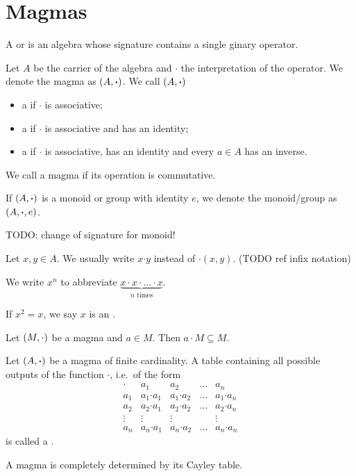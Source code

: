 \chapter{Magmas}
\begin{definition}
A  or  is an algebra whose signature contains a single ginary operator.

Let $A$ be the carrier of the algebra and $\boldsymbol{\cdot}$ the interpretation of the operator. We denote the magma as $\sSet{A,\boldsymbol{\cdot}}$. We call $\sSet{A,\boldsymbol{\cdot}}$
\begin{itemize}
\item a  if $\boldsymbol{\cdot}$ is associative;
\item a  if $\boldsymbol{\cdot}$ is associative and has an identity;
\item a  if $\boldsymbol{\cdot}$ is associative, has an identity and every $a\in A$ has an inverse.
\end{itemize}
We call a magma  if its operation is commutative.

If $\sSet{A,\boldsymbol{\cdot}}$ is a monoid or group with identity $e$, we denote the monoid/group as $\sSet{A,\boldsymbol{\cdot}, e}$.
\end{definition}
TODO: change of signature for monoid!

Let $x,y\in A$. We usually write $x\boldsymbol{\cdot} y$ instead of $\boldsymbol{\cdot}(x,y)$. (TODO ref infix notation)

\begin{definition}
We write $x^n$ to abbreviate $\underbrace{x\cdot x\cdot \ldots \cdot x}_{\text{$n$ times}}$.

If $x^2 = x$, we say $x$ is an .
\end{definition}

\begin{lemma}
Let $\sSet{M,\cdot}$ be a magma and $a\in M$. Then $a\cdot M \subseteq M$.
\end{lemma}

\begin{definition}
Let $\sSet{A,\boldsymbol{\cdot}}$ be a magma of finite cardinality. A table containing all possible outputs of the function $\boldsymbol{\cdot}$, i.e.\ of the form
\[ \begin{array}{l|llll}
\boldsymbol{\cdot} & a_1 & a_2 & \hdots & a_n \\ \hline
a_1 & a_1\boldsymbol{\cdot}a_1 & a_1\boldsymbol{\cdot}a_2 & \hdots & a_1\boldsymbol{\cdot}a_n \\
a_2 & a_2\boldsymbol{\cdot}a_1 & a_2\boldsymbol{\cdot}a_2 & \hdots & a_2\boldsymbol{\cdot}a_n \\
\vdots & \vdots & \vdots &  & \vdots \\
a_n & a_n\boldsymbol{\cdot}a_1 & a_n\boldsymbol{\cdot}a_2 & \hdots & a_n\boldsymbol{\cdot}a_n
\end{array} \]
is called a .
\end{definition}
A magma is completely determined by its Cayley table.

